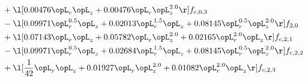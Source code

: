 \begin{alignat}{2}
& + \l[  0.00476 \opL_r \opL_z +  0.00476 \opL_r \opL_z^{2.0}  \r] f_{c,0,3} \nonumber \\ 
& - \l[  0.09971 \opL_r^{0.5} \opL_z +  0.02013 \opL_r^{1.5} \opL_z +  0.08145 \opL_r^{0.5} \opL_z^{2.0}  \r] f_{2,0} \nonumber \\ 
& + \l[  0.07143 \opL_r \opL_z +  0.05782 \opL_r \opL_z^{2.0} +  0.02165 \opL_r^{2.0} \opL_z  \r] f_{c,2,1} \nonumber \\ 
& - \l[  0.09971 \opL_r^{0.5} \opL_z +  0.02684 \opL_r^{1.5} \opL_z +  0.08145 \opL_r^{0.5} \opL_z^{2.0}  \r] f_{c,2,2} \nonumber \\ 
& + \l[ \frac{1}{42} \opL_r \opL_z +  0.01927 \opL_r \opL_z^{2.0} +  0.01082 \opL_r^{2.0} \opL_z  \r] f_{c,2,3} \nonumber \\ 
\end{alignat} 


